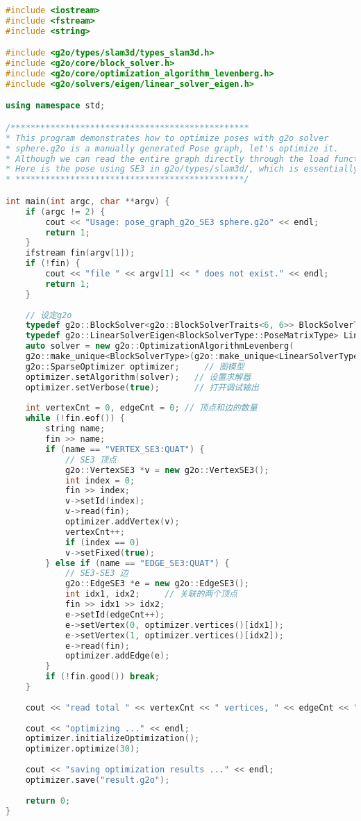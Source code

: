 \begin{lstlisting}[language=c++,caption=slambook2/ch10/pose\_graph\_g2o\_SE3.cpp]
#include <iostream>
#include <fstream>
#include <string>

#include <g2o/types/slam3d/types_slam3d.h>
#include <g2o/core/block_solver.h>
#include <g2o/core/optimization_algorithm_levenberg.h>
#include <g2o/solvers/eigen/linear_solver_eigen.h>

using namespace std;

/************************************************
* This program demonstrates how to optimize poses with g2o solver
* sphere.g2o is a manually generated Pose graph, let's optimize it.
* Although we can read the entire graph directly through the load function, we still implement the read code ourselves in order to gain a deeper understanding.
* Here is the pose using SE3 in g2o/types/slam3d/, which is essentially a quaternion instead of a Lie algebra.
* **********************************************/

int main(int argc, char **argv) {
    if (argc != 2) {
        cout << "Usage: pose_graph_g2o_SE3 sphere.g2o" << endl;
        return 1;
    }
    ifstream fin(argv[1]);
    if (!fin) {
        cout << "file " << argv[1] << " does not exist." << endl;
        return 1;
    }
    
    // 设定g2o
    typedef g2o::BlockSolver<g2o::BlockSolverTraits<6, 6>> BlockSolverType;
    typedef g2o::LinearSolverEigen<BlockSolverType::PoseMatrixType> LinearSolverType;
    auto solver = new g2o::OptimizationAlgorithmLevenberg(
    g2o::make_unique<BlockSolverType>(g2o::make_unique<LinearSolverType>()));
    g2o::SparseOptimizer optimizer;     // 图模型
    optimizer.setAlgorithm(solver);   // 设置求解器
    optimizer.setVerbose(true);       // 打开调试输出
    
    int vertexCnt = 0, edgeCnt = 0; // 顶点和边的数量
    while (!fin.eof()) {
        string name;
        fin >> name;
        if (name == "VERTEX_SE3:QUAT") {
            // SE3 顶点
            g2o::VertexSE3 *v = new g2o::VertexSE3();
            int index = 0;
            fin >> index;
            v->setId(index);
            v->read(fin);
            optimizer.addVertex(v);
            vertexCnt++;
            if (index == 0)
            v->setFixed(true);
        } else if (name == "EDGE_SE3:QUAT") {
            // SE3-SE3 边
            g2o::EdgeSE3 *e = new g2o::EdgeSE3();
            int idx1, idx2;     // 关联的两个顶点
            fin >> idx1 >> idx2;
            e->setId(edgeCnt++);
            e->setVertex(0, optimizer.vertices()[idx1]);
            e->setVertex(1, optimizer.vertices()[idx2]);
            e->read(fin);
            optimizer.addEdge(e);
        }
        if (!fin.good()) break;
    }
    
    cout << "read total " << vertexCnt << " vertices, " << edgeCnt << " edges." << endl;
    
    cout << "optimizing ..." << endl;
    optimizer.initializeOptimization();
    optimizer.optimize(30);
    
    cout << "saving optimization results ..." << endl;
    optimizer.save("result.g2o");
    
    return 0;
}
\end{lstlisting}


